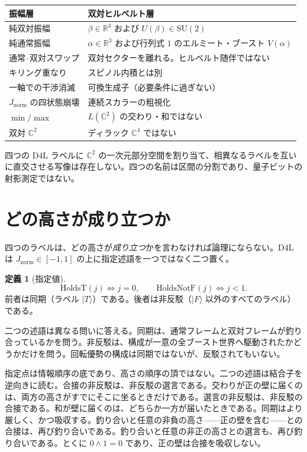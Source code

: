 \documentclass[a4paper]{article}
\theoremstyle{definition}
\newtheorem{definition}[theorem]{定義}
\newcommand{\Jnorm}{J_{\mathrm{norm}}}
\begin{document}
\begin{center}
\begin{tabular}{@{}ll@{}}
\toprule
振幅層 & 双対ヒルベルト層 \\
\midrule
純双対振幅 & \(\beta\in\mathbb{R}^3\) および \(U(\beta)\in\mathrm{SU}(2)\) \\
純通常振幅 & \(\alpha\in\mathbb{R}^3\) および行列式 \(1\) のエルミート・ブースト \(V(\alpha)\) \\
通常–双対スワップ & 双対セクターを離れる。ヒルベルト随伴ではない \\
キリング重なり & スピノル内積とは別 \\
一軸での干渉消滅 & 可換生成子（必要条件に過ぎない） \\
\(\Jnorm\) の四状態崩壊 & 連続スカラーの粗視化 \\
\(\min/\max\) & \(L(\mathbb{C}^2)\) の交わり・和ではない \\
双対 \(\mathbb{C}^2\) & ディラック \(\mathbb{C}^4\) ではない \\
\bottomrule
\end{tabular}
\end{center}

四つの D4L ラベルに \(\mathbb{C}^2\) の一次元部分空間を割り当て、相異なるラベルを互いに直交させる写像は存在しない。四つの名前は区間の分割であり、量子ビットの射影測定ではない。

\section{どの高さが成り立つか}
\label{sec:cons}

四つのラベルは、どの高さが\emph{成り立つ}かを言わなければ論理にならない。D4L は \(\Jnorm\in[-1,1]\) の上に指定述語を一つではなく二つ置く。

\begin{definition}[指定値]
\label{def:desig}
\[
\mathrm{HoldsT}(j)\iff j=0,
\qquad
\mathrm{HoldsNotF}(j)\iff j<1.
\]
前者は同期（ラベル \(\lvert T\rangle\)）である。後者は非反駁（\(\lvert F\rangle\) 以外のすべてのラベル）である。
\end{definition}

二つの述語は異なる問いに答える。同期は、通常フレームと双対フレームが釣り合っているかを問う。非反駁は、構成が一意の全ブースト世界へ駆動されたかどうかだけを問う。回転優勢の構成は同期ではないが、反駁されてもいない。

指定点は情報順序の底であり、高さの順序の頂ではない。二つの述語は結合子を逆向きに読む。合接の非反駁は、非反駁の選言である。交わりが正の壁に届くのは、両方の高さがすでにそこに坐るときだけである。選言の非反駁は、非反駁の合接である。和が壁に届くのは、どちらか一方が届いたときである。同期はより厳しく、かつ吸収する。釣り合いと任意の非負の高さ——正の壁を含む——との合接は、再び釣り合いである。釣り合いと任意の非正の高さとの選言も、再び釣り合いである。とくに \(0\wedge 1=0\) であり、正の壁は合接を吸収しない。
\end{document}
